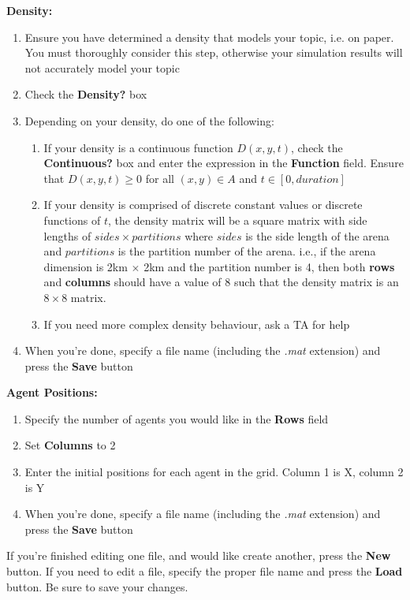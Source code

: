 \documentclass[../CourseManual.tex]{subfiles}
\begin{document}
\textbf{Density:}
\begin{enumerate}
    \item Ensure you have determined a density that models your topic, i.e. on paper. You must thoroughly consider this step, otherwise your simulation results will not accurately model your topic
    \item Check the \textbf{Density?} box
    \item Depending on your density, do one of the following:
    \begin{enumerate}[label=(\alph*)]
        \item If your density is a continuous function $D(x,y,t)$, check the \textbf{Continuous?} box and enter the expression in the \textbf{Function} field. Ensure that $D(x,y,t) \geq 0$ for all $(x,y) \in A$ and $t \in [0, duration]$
        \item If your density is comprised of discrete constant values or discrete functions of $t$, the density matrix will be a square matrix with side lengths of $sides \times partitions$ where $sides$ is the side length of the arena and $partitions$ is the partition number of the arena. i.e., if the arena dimension is 2km $\times$ 2km and the partition number is 4, then both \textbf{rows} and \textbf{columns} should have a value of 8 such that the density matrix is an  $8 \times 8$ matrix.
        \item If you need more complex density behaviour, ask a TA for help
    \end{enumerate}
    \item When you're done, specify a file name (including the \textit{.mat} extension) and press the \textbf{Save} button
\end{enumerate}

\textbf{Agent Positions:}
\begin{enumerate}
    \item Specify the number of agents you would like in the \textbf{Rows} field
    \item Set \textbf{Columns} to 2
    \item Enter the initial positions for each agent in the grid. Column 1 is X, column 2 is Y
    \item When you're done, specify a file name (including the \textit{.mat} extension) and press the \textbf{Save} button
\end{enumerate}
If you're finished editing one file, and would like create another, press the \textbf{New} button. If you need to edit a file, specify the proper file name and press the \textbf{Load} button. Be sure to save your changes.
\end{document}
